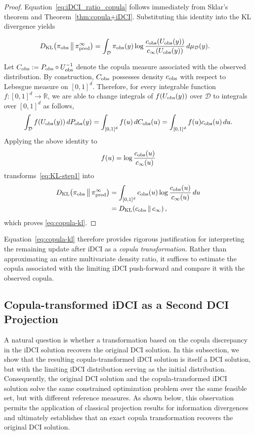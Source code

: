 \documentclass{article}
\newcommand{\dspace}{\mathcal{D}}
\begin{document}
\begin{proof}
Equation~\eqref{eq:iDCI_ratio_copula} follows immediately from  Sklar's theorem and Theorem~\ref{thm:copula+iDCI}.
Substituting this identity into the KL divergence yields

\begin{align}
D_{\rm KL}
\!\left(
\pi_{\rm obs}
\,\middle\|\,
\pi_{\rm pred}^{\infty}
\right)
&=
\int_\dspace
\pi_{\rm obs}(y)
\log
\frac{
c_{\rm obs}(U_{\rm obs}(y))
}{
c_{\infty}(U_{\rm obs}(y))
}
\,d\mu_\dspace(y).
\label{eq:KL-step1}
\end{align}

Let $C_{\rm obs}:=
P_{\rm obs}\circ U_{\rm obs}^{-1}
$ denote the copula measure associated with the observed distribution.
By construction, $C_{\rm obs}$ possesses density $c_{\rm obs}$ with respect to Lebesgue measure on $[0,1]^d$.
Therefore, for every integrable function
$f:[0,1]^d\rightarrow\mathbb R$, we are able to change integrals of $f(U_{\rm obs}(y))$ over $\dspace$ to integrals over $[0,1]^d$ as follows,
\[
\int_\dspace
f(U_{\rm obs}(y))
\,dP_{\rm obs}(y)
=
\int_{[0,1]^d}
f(u)
\,dC_{\rm obs}(u)
=
\int_{[0,1]^d}
f(u)
c_{\rm obs}(u)
\,du.
\]
Applying the above identity to
\[
f(u)
=
\log
\frac{c_{\rm obs}(u)}
     {c_{\infty}(u)}
\]
transforms~\eqref{eq:KL-step1}
into
\begin{align*}
D_{\rm KL}
\!\left(
\pi_{\rm obs}
\,\middle\|\,
\pi_{\rm pred}^{\infty}
\right)
&=
\int_{[0,1]^d}
c_{\rm obs}(u)
\log
\frac{
c_{\rm obs}(u)
}{
c_{\infty}(u)
}
\,du \\
&=
D_{\rm KL}
\!\left(
c_{\rm obs}
\,\middle\|\,
c_{\infty}
\right),
\end{align*}
which proves
\eqref{eq:copula-kl}.
\end{proof}

Equation~\eqref{eq:copula-kl} therefore provides rigorous justification for interpreting the remaining update after iDCI as a \emph{copula transformation}. Rather than approximating an entire multivariate density ratio, it suffices to estimate the copula associated with the limiting iDCI push-forward and compare it with the observed copula.

\subsection{Copula-transformed iDCI as a Second DCI Projection}\label{subsec:cc-iDCI}

A natural question is whether a transformation based on the copula discrepancy in the iDCI solution recovers the original DCI solution.
In this subsection, we show that the resulting copula-transformed iDCI solution is itself a DCI solution, but with the limiting iDCI distribution serving as the initial distribution.
Consequently, the original DCI solution and the copula-transformed iDCI solution solve the same constrained optimization problem over the same feasible set, but with different reference measures. As shown below, this observation permits the application of classical projection results for information divergences and ultimately establishes that an exact copula transformation recovers the original DCI solution.
\end{document}
